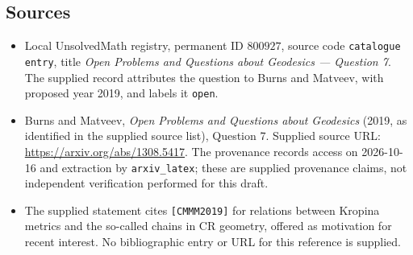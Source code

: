 \documentclass[11pt]{article}
\begin{document}
\subsection{Sources}
\begin{itemize}
\item Local UnsolvedMath registry, permanent ID \(800927\), source code \texttt{catalogue entry}, title \emph{Open Problems and Questions about Geodesics --- Question 7}. The supplied record attributes the question to Burns and Matveev, with proposed year 2019, and labels it \texttt{open}.
\item Burns and Matveev, \emph{Open Problems and Questions about Geodesics} (2019, as identified in the supplied source list), Question 7. Supplied source URL: \url{https://arxiv.org/abs/1308.5417}. The provenance records access on 2026-10-16 and extraction by \texttt{arxiv\_latex}; these are supplied provenance claims, not independent verification performed for this draft.
\item The supplied statement cites \texttt{[CMMM2019]} for relations between Kropina metrics and the so-called chains in CR geometry, offered as motivation for recent interest. No bibliographic entry or URL for this reference is supplied.
\end{itemize}
\end{document}
